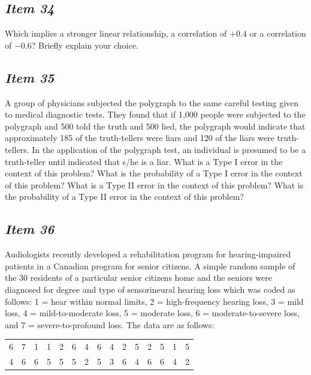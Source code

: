 \subsection{\textbf{\textit{Item 34}}}
Which implies a stronger linear relationship, a correlation of $+0.4$ or a correlation of $-0.6$?  Briefly explain your choice.

\subsection{\textbf{\textit{Item 35}}}
A group of physicians subjected the polygraph to the same careful testing given to medical diagnostic tests.  They found that if 1,000 people were subjected to the polygraph and 500 told the truth and 500 lied, the polygraph would indicate that approximately 185 of the truth-tellers were liars and 120 of the liars were truth-tellers.  In the application of the polygraph test, an individual is presumed to be a truth-teller until indicated that s/he is a liar. What is a Type I error in the context of this problem?  What is the probability of a Type I error in the context of this problem?  What is a Type II error in the context of this problem?  What is the probability of a Type II error in the context of this problem?


\subsection{\textbf{\textit{Item 36}}}
Audiologists recently developed a rehabilitation program for hearing-impaired patients in a Canadian program for senior citizens.  A simple random sample of the 30 residents of a particular senior citizens home and the seniors were diagnosed for degree and type of sensorineural hearing loss which was coded as follows: 1 = hear within normal limits, 2 = high-frequency hearing loss, 3 = mild loss, 4 = mild-to-moderate loss, 5 = moderate loss, 6 = moderate-to-severe loss, and 7 = severe-to-profound loss.  The data are as follows: 

\begin{table}[!ht]
\begin{center}
\begin{tabular}{lllllllllllllll}
6 & 7 & 1 & 1 & 2 & 6 & 4 & 6 & 4 & 2 & 5 & 2 & 5 & 1&  5\\
4 & 6 & 6 & 5 & 5 & 5 & 2 & 5 & 3 & 6 & 4 & 6 & 6 & 4 & 2\\
\end{tabular}
\end{center}
\end{table}
 
